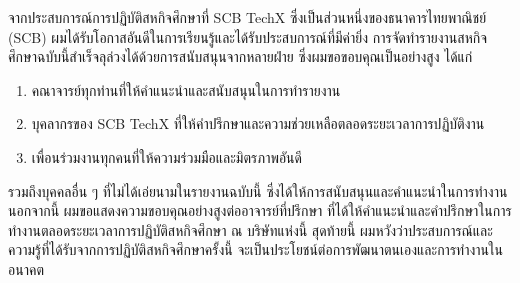 \begin{acknowledgments}
    จากประสบการณ์การปฏิบัติสหกิจศึกษาที่ SCB TechX ซึ่งเป็นส่วนหนึ่งของธนาคารไทยพาณิชย์ (SCB) ผมได้รับโอกาสอันดีในการเรียนรู้และได้รับประสบการณ์ที่มีค่ายิ่ง การจัดทำรายงานสหกิจศึกษาฉบับนี้สำเร็จลุล่วงได้ด้วยการสนับสนุนจากหลายฝ่าย ซึ่งผมขอขอบคุณเป็นอย่างสูง ได้แก่
    \begin{enumerate}
        \item คณาจารย์ทุกท่านที่ให้คำแนะนำและสนับสนุนในการทำรายงาน
        \item บุคลากรของ SCB TechX ที่ให้คำปรึกษาและความช่วยเหลือตลอดระยะเวลาการปฏิบัติงาน
        \item เพื่อนร่วมงานทุกคนที่ให้ความร่วมมือและมิตรภาพอันดี
    \end{enumerate}
    รวมถึงบุคคลอื่น ๆ ที่ไม่ได้เอ่ยนามในรายงานฉบับนี้ ซึ่งได้ให้การสนับสนุนและคำแนะนำในการทำงาน นอกจากนี้ ผมขอแสดงความขอบคุณอย่างสูงต่ออาจารย์ที่ปรึกษา ที่ได้ให้คำแนะนำและคำปรึกษาในการทำงานตลอดระยะเวลาการปฏิบัติสหกิจศึกษา ณ บริษัทแห่งนี้
    สุดท้ายนี้ ผมหวังว่าประสบการณ์และความรู้ที่ได้รับจากการปฏิบัติสหกิจศึกษาครั้งนี้ จะเป็นประโยชน์ต่อการพัฒนาตนเองและการทำงานในอนาคต
\end{acknowledgments}%
\fi %

\contentspage %

\ifproject
\figurelistpage

\fi %



